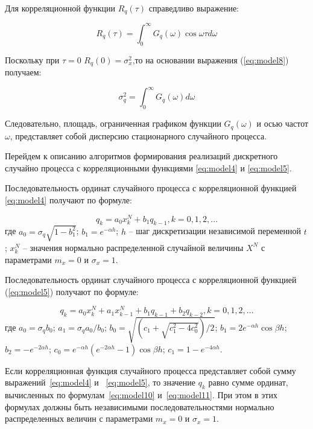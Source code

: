 Для корреляционной функции ${R}_{q}(\tau)$ справедливо выражение:

\begin{equation} \label{eq:model8}
R_q(\tau) = \int_{0}^{\infty} G_q(\omega) \cos\omega\tau d\omega
\end{equation}

Поскольку при $\tau = 0$ $R_q(0) = {\sigma}_{x}^{2}$,то на основании выражения (\ref{eq:model8}) получаем:

\begin{equation} \label{eq:model9}
{\sigma}_{q}^{2} = \int_{0}^{\infty} G_q(\omega) d\omega
\end{equation}

Следовательно, площадь, ограниченная графиком функции $G_q(\omega)$ и осью
частот $\omega$, представляет собой дисперсию стационарного случайного процесса.

Перейдем к описанию алгоритмов формирования реализаций дискретного
случайно процесса с корреляционными функциями \ref{eq:model4} и \ref{eq:model5}.

Последовательность ординат случайного процесса с корреляционной
функцией \ref{eq:model4} получают по формуле:

\begin{equation} \label{eq:model10}
{q}_{k} = a_0 x_{k}^{N} + b_1 q_{k-1}, k=0,1,2,...
\end{equation}
где $a_0 = \sigma_q \sqrt{1 - b_1^2}$;
$b_1 = e^{-\alpha h}$;
$h$ -- шаг дискретизации независимой переменной $t$;
$x_k^N$ -- значения нормально распределенной случайной величины $X^N$ с
параметрами $m_x = 0$ и $\sigma_x = 1$.

Последовательность ординат случайного процесса с корреляционной
функцией (\ref{eq:model5}) получают по формуле:

\begin{equation} \label{eq:model11}
{q}_{k} = a_0 x_{k}^{N} + a_1 x_{k-1}^{N} +  b_1 q_{k-1} +  b_2 q_{k-2}, k=0,1,2,...
\end{equation}
где $a_0 = \sigma_q b_0$;
$a_1 = \sigma_q a_0 / b_0$;
$b_0 = \sqrt{(c_1 + \sqrt{c_1^2 - 4c_0^2})/2}$;
$b_1 = 2e^{-\alpha h} \cos\beta h$;
$b_2 = -e^{-2\alpha h}$;
$c_0 = e^{-\alpha h} (e^{-2\alpha h} - 1) \cos\beta h$;
$c_1 = 1 - e^{-4\alpha h}$.

Если корреляционная функция случайного процесса представляет собой
сумму выражений~\ref{eq:model4} и ~\ref{eq:model5}, то значение $q_k$ равно сумме ординат, вычисленных
по формулам~\ref{eq:model10} и~\ref{eq:model11}. При этом в этих формулах должны быть
независимыми последовательностями нормально распределенных величин с
параметрами $m_x = 0$ и $\sigma_x = 1$.

